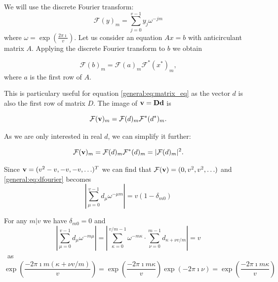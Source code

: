     We will use the discrete Fourier transform:
    \begin{equation}
        \mathcal F (y)_m = \sum_{j=0}^{v-1} y_j \omega^{-jm}
    \end{equation}
    where $\omega = \exp(\frac{2\pi \imath}v)$. Let us consider an equation $Ax=b$ with anticirculant matrix $A$. Applying the discrete Fourier transform to $b$ we obtain
    
    \begin{equation}
        \label{general:eq:fourier_image}
        \mathcal F (b)_m = \mathcal F (a)_m \mathcal F ^*(x^*)_m,
    \end{equation}
    where $a$ is the first row of $A$.
    
    This is particulary useful for equation \eqref{general:eq:matrix_eq} as the vector $d$ is also the first row of matrix $D$. The image of $\bf v=Dd$ is
    
    \begin{equation}
        \mathcal{F} ({\bf v})_m = \mathcal{F}(d)_m \mathcal{F^*}(d^*)_m.
    \end{equation}

    As we are only interested in real $d$, we can simplify it further:
    
    \begin{equation}
        \label{general:eq:dfourier}
        \mathcal{F} ({\bf v})_m = \mathcal{F}(d)_m \mathcal{F^*}(d)_m = |\mathcal{F}(d)_m|^2.
    \end{equation}
    
    Since ${\bf v} = (v^2-v, -v, -v, \ldots)^T$ we can find that $\mathcal{F}({\bf v}) = (0,v^2,v^2,\ldots)$ and \eqref{general:eq:dfourier} becomes
    \begin{equation}
        \label{gen:eq:dfourierfinal}
        \left| \sum_{\mu=0}^{v-1} d_\mu \omega^{-\mu m} \right| = v (1-\delta_{m0})
    \end{equation}

    For any $m | v$ we have $\delta_{m0}=0$ and
    \begin{equation}
        \label{general:eq:split_fourier}
        \left| \sum_{\mu=0}^{v-1} d_\mu \omega^{-m\mu} \right|
        = \left| \sum_{\kappa=0}^{v/m-1} \omega^{-m\kappa} \cdot \sum_{\nu=0}^{m-1}  d_{\kappa+\nu v/m} \right|
        =v
    \end{equation}\
    as 
    \begin{equation}
        \exp\left(\frac{-2\pi \imath m (\kappa+\nu v/m)}v\right) = \exp\left(\frac{-2\pi \imath m \kappa}v\right) \exp\left(-2\pi \imath \nu\right) = \exp\left(\frac{-2\pi \imath m \kappa}v\right)
    \end{equation}
    
